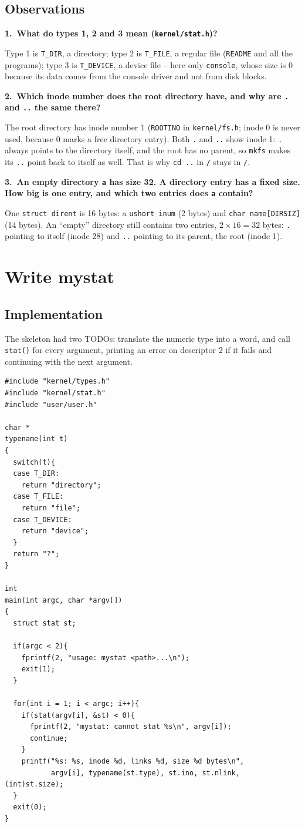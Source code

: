 \documentclass[12pt,a4paper]{article}
\newcommand{\qa}[2]{%
  \par\needspace{5\baselineskip}\medskip
  \noindent\textbf{#1.~#2}\par\smallskip\noindent}
\begin{document}
\subsection*{Observations}

\qa{1}{What do types 1, 2 and 3 mean (\texttt{kernel/stat.h})?}
Type 1 is \texttt{T\_DIR}, a directory; type 2 is \texttt{T\_FILE}, a regular file (\texttt{README} and all the programs); type 3 is \texttt{T\_DEVICE}, a device file -- here only \texttt{console}, whose size is 0 because its data comes from the console driver and not from disk blocks.

\qa{2}{Which inode number does the root directory have, and why are \texttt{.} and \texttt{..} the same there?}
The root directory has inode number 1 (\texttt{ROOTINO} in \texttt{kernel/fs.h}; inode 0 is never used, because 0 marks a free directory entry). Both \texttt{.} and \texttt{..} show inode 1: \texttt{.} always points to the directory itself, and the root has no parent, so \texttt{mkfs} makes its \texttt{..} point back to itself as well. That is why \texttt{cd ..} in \texttt{/} stays in \texttt{/}.

\qa{3}{An empty directory \texttt{a} has size 32. A directory entry has a fixed size. How big is one entry, and which two entries does \texttt{a} contain?}
One \texttt{struct dirent} is 16 bytes: a \texttt{ushort inum} (2 bytes) and \texttt{char name[DIRSIZ]} (14 bytes). An ``empty'' directory still contains two entries, $2 \times 16 = 32$ bytes: \texttt{.} pointing to itself (inode 28) and \texttt{..} pointing to its parent, the root (inode 1).

\newpage
\section{Write mystat}

\subsection{Implementation}

The skeleton had two TODOs: translate the numeric type into a word, and call \texttt{stat()} for every argument, printing an error on descriptor 2 if it fails and continuing with the next argument.

\begin{lstlisting}[style=code,caption={user/mystat.c}]
#include "kernel/types.h"
#include "kernel/stat.h"
#include "user/user.h"

char *
typename(int t)
{
  switch(t){
  case T_DIR:
    return "directory";
  case T_FILE:
    return "file";
  case T_DEVICE:
    return "device";
  }
  return "?";
}

int
main(int argc, char *argv[])
{
  struct stat st;

  if(argc < 2){
    fprintf(2, "usage: mystat <path>...\n");
    exit(1);
  }

  for(int i = 1; i < argc; i++){
    if(stat(argv[i], &st) < 0){
      fprintf(2, "mystat: cannot stat %s\n", argv[i]);
      continue;
    }
    printf("%s: %s, inode %d, links %d, size %d bytes\n",
           argv[i], typename(st.type), st.ino, st.nlink, (int)st.size);
  }
  exit(0);
}
\end{lstlisting}
\end{document}

